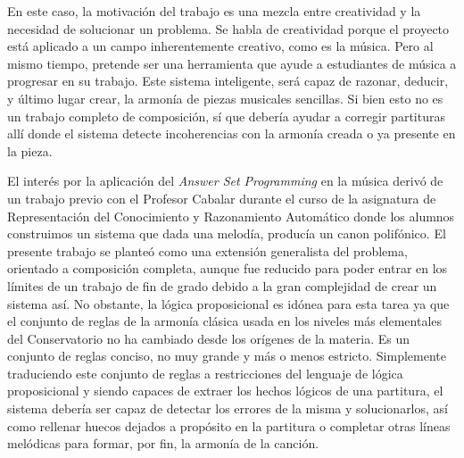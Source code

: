  En este caso, la motivación del trabajo es una mezcla entre creatividad y la necesidad de solucionar un problema. Se habla de creatividad porque el proyecto está aplicado a un campo inherentemente creativo, como es la música. Pero al mismo tiempo, pretende ser una herramienta que ayude a estudiantes de música a progresar en su trabajo. Este sistema inteligente, será capaz de razonar, deducir, y último lugar crear, la armonía de piezas musicales sencillas. Si bien esto no es un trabajo completo de composición, sí que debería ayudar a corregir partituras allí donde el sistema detecte incoherencias con la armonía creada o ya presente en la pieza. 
 
 El interés por la aplicación del \textit{Answer Set Programming} en la música derivó de un trabajo previo con el Profesor Cabalar durante el curso de la asignatura de Representación del Conocimiento y Razonamiento Automático donde los alumnos construimos un sistema que dada una melodía, producía un canon polifónico. El presente trabajo se planteó como una extensión generalista del problema, orientado a composición completa, aunque fue reducido para poder entrar en los límites de un trabajo de fin de grado debido a la gran complejidad de crear un sistema así. No obstante, la lógica proposicional es idónea para esta tarea ya que el conjunto de reglas de la armonía clásica usada en los niveles más elementales del Conservatorio no ha cambiado desde los orígenes de la materia. Es un conjunto de reglas conciso, no muy grande y más o menos estricto. Simplemente traduciendo este conjunto de reglas a restricciones del lenguaje de lógica proposicional y siendo capaces de extraer los hechos lógicos de una partitura, el sistema debería ser capaz de detectar los errores de la misma y solucionarlos, así como rellenar huecos dejados a propósito en la partitura o completar otras líneas melódicas para formar, por fin, la armonía de la canción.
 
